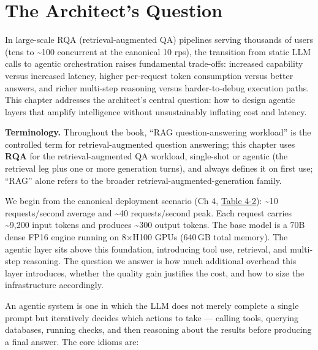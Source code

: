 \section*{The Architect's Question}\label{the-architects-question}

In large-scale RQA (retrieval-augmented QA) pipelines serving thousands
of users (tens to \textasciitilde100 concurrent at the canonical 10
rps), the transition from static LLM calls to agentic orchestration
raises fundamental trade-offs: increased capability versus increased
latency, higher per-request token consumption versus better answers, and
richer multi-step reasoning versus harder-to-debug execution paths. This
chapter addresses the architect's central question: how to design
agentic layers that amplify intelligence without unsustainably inflating
cost and latency.

\textbf{Terminology.} Throughout the book, ``RAG question-answering
workload'' is the controlled term for retrieval-augmented question
answering; this chapter uses \textbf{RQA} for the retrieval-augmented QA
workload, single-shot or agentic (the retrieval leg plus one or more
generation turns), and always defines it on first use; ``RAG'' alone
refers to the broader retrieval-augmented-generation family.

We begin from the canonical deployment scenario (Ch 4, \hyperref[tab:4.2]{Table 4-2}):
\textasciitilde10 requests/second average and \textasciitilde40
requests/second peak. Each request carries \textasciitilde9,200 input
tokens and produces \textasciitilde300 output tokens. The base model is
a 70B dense FP16 engine running on 8×H100 GPUs (640\,GB total memory).
The agentic layer sits above this foundation, introducing tool use,
retrieval, and multi-step reasoning. The question we answer is how much
additional overhead this layer introduces, whether the quality gain
justifies the cost, and how to size the infrastructure accordingly.

\label{concept}


An agentic system is one in which the LLM does not merely complete a
single prompt but iteratively decides which actions to take --- calling
tools, querying databases, running checks, and then reasoning about the
results before producing a final answer. The core idioms are:

